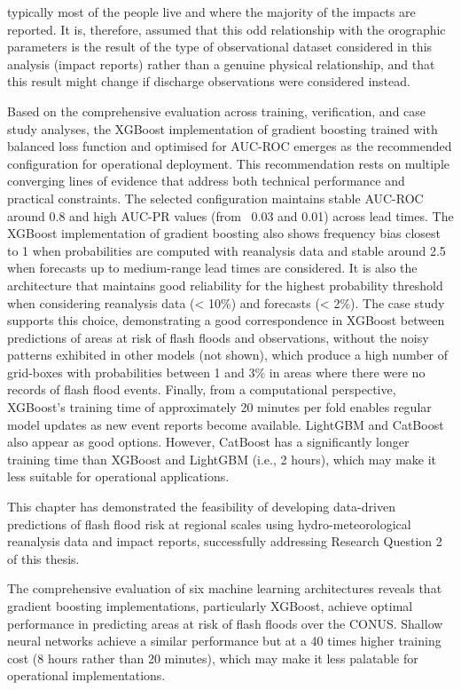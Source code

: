 \documentclass[nhess, manuscript]{copernicus}
\begin{document}
typically most of the people live and where the majority of the impacts are reported. It is, therefore, assumed that this odd relationship with the orographic parameters is the result of the type of observational dataset considered in this analysis (impact reports) rather than a genuine physical relationship, and that this result might change if discharge observations were considered instead. 

Based on the comprehensive evaluation across training, verification, and case study analyses, the XGBoost implementation of gradient boosting trained with balanced loss function and optimised for AUC-ROC emerges as the recommended configuration for operational deployment. This recommendation rests on multiple converging lines of evidence that address both technical performance and practical constraints. The selected configuration maintains stable AUC-ROC around 0.8 and high AUC-PR values (from ~0.03 and 0.01) across lead times. The XGBoost implementation of gradient boosting also shows frequency bias closest to 1 when probabilities are computed with reanalysis data and stable around 2.5 when forecasts up to medium-range lead times are considered. It is also the architecture that maintains good reliability for the highest probability threshold when considering reanalysis data (< 10\%) and forecasts (< 2\%). The case study supports this choice, demonstrating a good correspondence in XGBoost between predictions of areas at risk of flash floods and observations, without the noisy patterns exhibited in other models (not shown), which produce a high number of grid-boxes with probabilities between 1 and 3\% in areas where there were no records of flash flood events. Finally, from a computational perspective, XGBoost's training time of approximately 20 minutes per fold enables regular model updates as new event reports become available. LightGBM and CatBoost also appear as good options. However, CatBoost has a significantly longer training time than XGBoost and LightGBM (i.e., 2 hours), which may make it less suitable for operational applications.


\conclusions 
This chapter has demonstrated the feasibility of developing data-driven predictions of flash flood risk at regional scales using hydro-meteorological reanalysis data and impact reports, successfully addressing Research Question 2 of this thesis. 

The comprehensive evaluation of six machine learning architectures reveals that gradient boosting implementations, particularly XGBoost, achieve optimal performance in predicting areas at risk of flash floods over the CONUS. Shallow neural networks achieve a similar performance but at a 40 times higher training cost (8 hours rather than 20 minutes), which may make it less palatable for operational implementations. 
\end{document}
